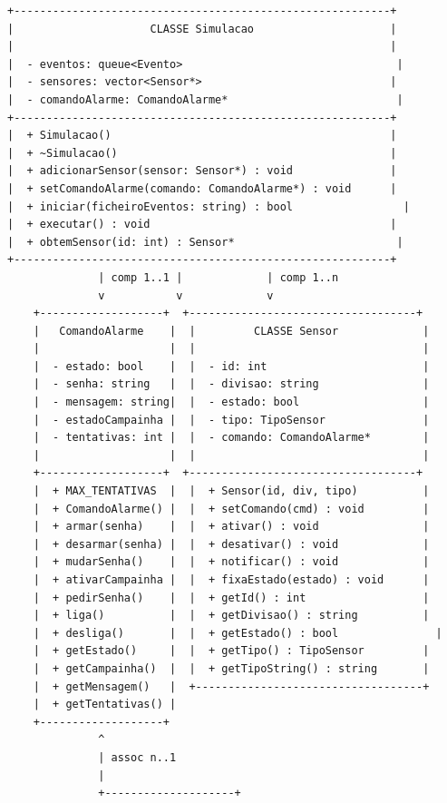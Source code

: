 \documentclass[12pt,a4paper]{article}
\begin{document}
\begin{verbatim}
+----------------------------------------------------------+
|                     CLASSE Simulacao                     |
|                                                          |
|  - eventos: queue<Evento>                                 |
|  - sensores: vector<Sensor*>                             |
|  - comandoAlarme: ComandoAlarme*                          |
+----------------------------------------------------------+
|  + Simulacao()                                           |
|  + ~Simulacao()                                          |
|  + adicionarSensor(sensor: Sensor*) : void               |
|  + setComandoAlarme(comando: ComandoAlarme*) : void      |
|  + iniciar(ficheiroEventos: string) : bool                 |
|  + executar() : void                                     |
|  + obtemSensor(id: int) : Sensor*                         |
+----------------------------------------------------------+
              | comp 1..1 |             | comp 1..n
              v           v             v
    +-------------------+  +-----------------------------------+
    |   ComandoAlarme    |  |         CLASSE Sensor             |
    |                    |  |                                   |
    |  - estado: bool    |  |  - id: int                        |
    |  - senha: string   |  |  - divisao: string                |
    |  - mensagem: string|  |  - estado: bool                   |
    |  - estadoCampainha |  |  - tipo: TipoSensor               |
    |  - tentativas: int |  |  - comando: ComandoAlarme*        |
    |                    |  |                                   |
    +-------------------+  +-----------------------------------+
    |  + MAX_TENTATIVAS  |  |  + Sensor(id, div, tipo)          |
    |  + ComandoAlarme() |  |  + setComando(cmd) : void         |
    |  + armar(senha)    |  |  + ativar() : void                |
    |  + desarmar(senha) |  |  + desativar() : void             |
    |  + mudarSenha()    |  |  + notificar() : void             |
    |  + ativarCampainha |  |  + fixaEstado(estado) : void      |
    |  + pedirSenha()    |  |  + getId() : int                  |
    |  + liga()          |  |  + getDivisao() : string          |
    |  + desliga()       |  |  + getEstado() : bool               |
    |  + getEstado()     |  |  + getTipo() : TipoSensor         |
    |  + getCampainha()  |  |  + getTipoString() : string       |
    |  + getMensagem()   |  +-----------------------------------+
    |  + getTentativas() |  
    +-------------------+  
              ^                    
              | assoc n..1         
              |                    
              +--------------------+


\end{verbatim}
\end{document}
